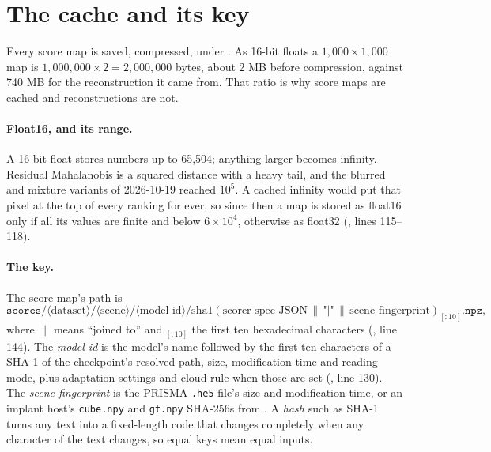 \section{The cache and its key}\label{sec:runeval:cache}

Every score map is saved, compressed, under . As 16-bit floats a
$1{,}000 \times 1{,}000$ map is $1{,}000{,}000 \times 2 = 2{,}000{,}000$ bytes, about 2 MB before compression, against
740 MB for the reconstruction it came from. That ratio is why score maps are cached and reconstructions are not.

\paragraph{Float16, and its range.} A 16-bit float stores numbers up to 65,504; anything larger becomes infinity.
Residual Mahalanobis is a squared distance with a heavy tail, and the blurred and mixture variants of 2026-10-19
reached $10^5$. A cached infinity would put that pixel at the top of every ranking for ever, so since then a map is
stored as float16 only if all its values are finite and below $6 \times 10^4$, otherwise as float32
(, lines 115--118).

\paragraph{The key.} The score map's path is
\begin{equation}\label{eq:runeval:path}
\texttt{scores/}\langle\text{dataset}\rangle\texttt{/}\langle\text{scene}\rangle\texttt{/}\langle\text{model id}\rangle\texttt{/}
\mathrm{sha1}(\text{scorer spec JSON} \,\|\, \texttt{"|"} \,\|\, \text{scene fingerprint})_{[:10]}\texttt{.npz},
\end{equation}
where $\|$ means ``joined to'' and $_{[:10]}$ the first ten hexadecimal characters (, line 144). The
\emph{model id} is the model's name followed by the first ten characters of a SHA-1 of the checkpoint's resolved path,
size, modification time and reading mode, plus adaptation settings and cloud rule when those are set
(, line 130). The \emph{scene fingerprint} is the PRISMA \texttt{.he5} file's size and modification time,
or an implant host's \texttt{cube.npy} and \texttt{gt.npy} SHA-256s from . A
\emph{hash} such as SHA-1 turns any text into a fixed-length code that changes completely when any
character of the text changes, so equal keys mean equal inputs.

